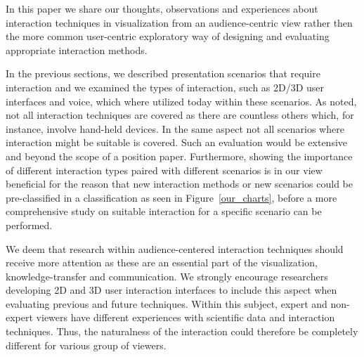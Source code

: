 \documentclass[review,journal]{vgtc}         %
\begin{document}
In this paper we share our thoughts, observations and experiences about interaction techniques in visualization from an audience-centric view rather then the more common user-centric exploratory way of designing and evaluating appropriate interaction methods.

In the previous sections, we described presentation scenarios that require interaction and we examined the types of interaction, such as 2D/3D user interfaces and voice, which where utilized today within these scenarios.
As noted, not all interaction techniques are covered as there are countless others which, for instance, involve hand-held devices.
In the same aspect not all scenarios where interaction might be suitable is covered.
Such an evaluation would be extensive and beyond the scope of a position paper.
Furthermore, showing the importance of different interaction types paired with different scenarios is in our view beneficial for the reason that new interaction methods or new scenarios could be pre-classified in a classification as seen in Figure~\ref{our_charts}, before a more comprehensive study on suitable interaction for a specific scenario can be performed.

We deem that research within audience-centered interaction techniques should receive more attention as these are an essential part of the visualization, knowledge-transfer and communication. 
We strongly encourage researchers developing 2D and 3D user interaction interfaces to include this aspect when evaluating previous and future techniques.
Within this subject, expert and non-expert viewers have different experiences with scientific data and interaction techniques. Thus, the naturalness of the interaction could therefore be completely different for various group of viewers.


\end{document}
